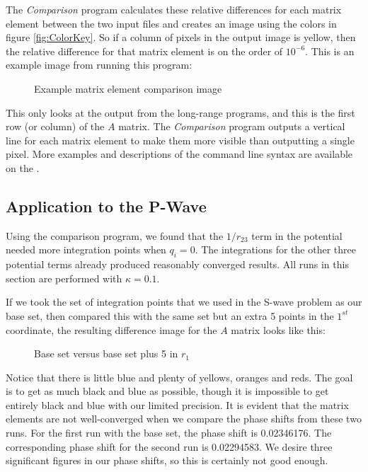 \documentclass[Dissertation.tex]{subfiles}
\begin{document}
The \emph{Comparison} program calculates these relative differences for each matrix element between the two input files and creates an image using the colors in figure \ref{fig:ColorKey}. So if a column of pixels in the output image is yellow, then the relative difference for that matrix element is on the order of $10^{-6}$. This is an example image from running this program:
\begin{figure}[H]
	\centering
	\caption{Example matrix element comparison image}
	\label{fig:QuadExample}
\end{figure}
This only looks at the output from the long-range programs, and this is the first row (or column) of the $A$ matrix. The \emph{Comparison} program outputs a vertical line for each matrix element to make them more visible than outputting a single pixel. More examples and descriptions of the command line syntax are available on the  \cite{Wiki}.

\subsection{Application to the P-Wave}

Using the comparison program, we found that the $1/r_{23}$ term in the potential needed more integration points when $q_i = 0$. The integrations for the other three potential terms already produced reasonably converged results. All runs in this section are performed with $\kappa = 0.1$.

If we took the set of integration points that we used in the S-wave problem as our base set, then compared this with the same set but an extra 5 points in the $1^{st}$ coordinate, the resulting difference image for the $A$ matrix looks like this:
\begin{figure}[H]
	\centering
	\caption{Base set versus base set plus 5 in $r_1$}
	\label{fig:BasevsBaseplus5}
\end{figure}
\noindent Notice that there is little blue and plenty of yellows, oranges and reds. The goal is to get as much black and blue as possible, though it is impossible to get entirely black and blue with our limited precision. It is evident that the matrix elements are not well-converged when we compare the phase shifts from these two runs. For the first run with the base set, the phase shift is 0.02346176. The corresponding phase shift for the second run is 0.02294583. We desire three significant figures in our phase shifts, so this is certainly not good enough.
\end{document}
